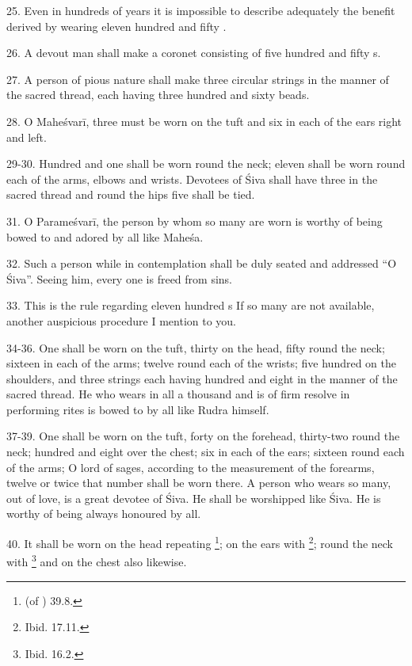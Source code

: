 25. Even in hundreds of years it is impossible to describe adequately
the benefit derived by wearing eleven hundred and fifty .

26. A devout man shall make a coronet consisting of five hundred and fifty
s.

27. A person of pious nature shall make three circular strings in the manner of
the sacred thread, each having three hundred and sixty beads.

28. O Maheśvarī, three  must be worn on the tuft and six in each
of the ears right and left.

29-30. Hundred and one  shall be worn round the neck; eleven
 shall be worn round each of the arms, elbows and wrists. Devotees
of Śiva shall have three  in the sacred thread and round the hips
five  shall be tied.

31. O Parameśvarī, the person by whom so many  are worn is worthy
of being bowed to and adored by all like Maheśa.

32. Such a person while in contemplation shall be duly seated and addressed
“O Śiva”. Seeing him, every one is freed from sins.

33. This is the rule regarding eleven hundred s If so many are not
available, another auspicious procedure I mention to you.

34-36. One  shall be worn on the tuft, thirty on the head, fifty
round the neck; sixteen in each of the arms; twelve round each of the wrists;
five hundred on the shoulders, and three strings each having hundred and eight
in the manner of the sacred thread. He who wears in all a thousand
 and is of firm resolve in performing rites is bowed to by all
 like Rudra himself.

37-39. One  shall be worn on the tuft, forty on the forehead,
thirty-two round the neck; hundred and eight over the chest; six in each of
the ears; sixteen round each of the arms; O lord of sages, according to
the measurement of the forearms, twelve or twice that number shall be worn there.
A person who wears so many, out of love, is a great devotee of Śiva. He shall
be worshipped like Śiva. He is worthy of being always honoured by all.

40. It shall be worn on the head repeating \footnote{
 (of ) 39.8.}; on the ears with
\footnote{Ibid. 17.11.}; round the neck with \footnote{Ibid. 16.2.} and on the chest also likewise.

